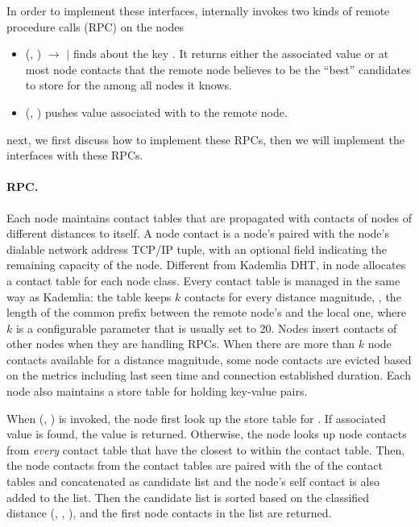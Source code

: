 In order to implement these interfaces, internally \dht invokes two kinds of remote procedure calls (RPC) on the nodes
\begin{itemize}
    \item \ffind(, ) $\to$  $|$  finds about the key .
    It returns either the associated value  or at most  node contacts that the remote node believes to be the ``best'' candidates to store for the  among all nodes it knows.
    \item \fpush(, ) pushes value associated with  to the remote node.
\end{itemize}
\noindent next, we first discuss how to implement these RPCs, then we will implement the interfaces with these RPCs.

\paragraph{{\normalfont\ffind} RPC\@.}
Each node maintains contact tables that are propagated with contacts of nodes of different distances to itself.
A node contact is a node's \vid paired with the node's dialable network address \eg TCP/IP tuple, with an optional  field indicating the remaining capacity of the node.
Different from Kademlia DHT, in \dht node allocates a contact table for each node class.
Every contact table is managed in the same way as Kademlia: the table keeps $k$ contacts for every distance magnitude, \ie, the length of the common prefix between the remote node's \vid and the local one, where $k$ is a configurable parameter that is usually set to 20.
Nodes insert contacts of other nodes when they are handling \ffind RPCs.
When there are more than $k$ node contacts available for a distance magnitude, some node contacts are evicted based on the metrics including last seen time and connection established duration.
Each node also maintains a store table for holding key-value pairs.

When \ffind(, ) is invoked, the node first look up the store table for .
If associated value is found, the value is returned.
Otherwise, the node looks up  node contacts from \emph{every} contact table that have the closest \vid to  within the contact table.
Then, the node contacts from the contact tables are paired with the \vclass of the contact tables and concatenated as candidate list and the node's self contact is also added to the list.
Then the candidate list is sorted based on the classified  distance \ie \fdist(\vid, , \vclass), and the first  node contacts in the list are returned.

